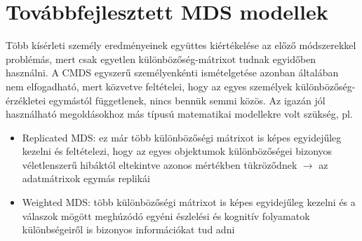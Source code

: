 \section{Továbbfejlesztett MDS modellek}

Több kísérleti személy eredményeinek együttes kiértékelése az előző módszerekkel problémás, mert csak egyetlen különbözőség-mátrixot tudnak egyidőben használni. A CMDS egyszerű személyenkénti ismételgetése azonban általában nem elfogadható, mert közvetve feltételei, hogy az egyes személyek különbözőség-érzékletei  egymástól függetlenek, nincs bennük semmi közös. Az igazán jól használható megoldásokhoz más típusú matematikai modellekre volt szükség, pl.
\begin{itemize}
\item Replicated MDS: ez már több különbözőségi mátrixot is képes egyidejűleg kezelni és feltételezi, hogy az egyes objektumok különbözőségei bizonyos véletlenszerű hibáktól eltekintve azonos mértékben tükröződnek $\rightarrow$ az adatmátrixok egymás replikái
\item Weighted MDS: több különbözőségi mátrixot is képes egyidejűleg kezelni és a válaszok mögött meghúzódó egyéni észlelési és kognitív folyamatok különbségeiről is bizonyos információkat tud adni
\end{itemize} 
